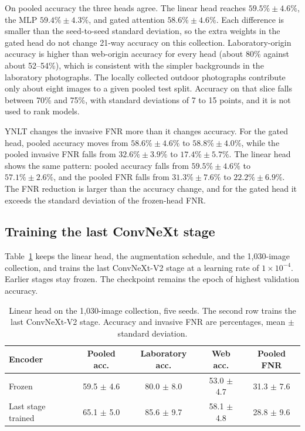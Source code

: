 \documentclass[final,3p,times,twocolumn]{elsarticle}
\begin{document}
On pooled accuracy the three heads agree. The linear head reaches \(59.5\% \pm 4.6\%\), the MLP \(59.4\% \pm 4.3\%\), and gated attention \(58.6\% \pm 4.6\%\). Each difference is smaller than the seed-to-seed standard deviation, so the extra weights in the gated head do not change 21-way accuracy on this collection. Laboratory-origin accuracy is higher than web-origin accuracy for every head (about 80\% against about 52--54\%), which is consistent with the simpler backgrounds in the laboratory photographs. The locally collected outdoor photographs contribute only about eight images to a given pooled test split. Accuracy on that slice falls between 70\% and 75\%, with standard deviations of 7 to 15 points, and it is not used to rank models.

YNLT changes the invasive FNR more than it changes accuracy. For the gated head, pooled accuracy moves from \(58.6\% \pm 4.6\%\) to \(58.8\% \pm 4.0\%\), while the pooled invasive FNR falls from \(32.6\% \pm 3.9\%\) to \(17.4\% \pm 5.7\%\). The linear head shows the same pattern: pooled accuracy falls from \(59.5\% \pm 4.6\%\) to \(57.1\% \pm 2.6\%\), and the pooled FNR falls from \(31.3\% \pm 7.6\%\) to \(22.2\% \pm 6.9\%\). The FNR reduction is larger than the accuracy change, and for the gated head it exceeds the standard deviation of the frozen-head FNR.

\subsection{Training the last ConvNeXt stage}
\label{subsec:laststage}

Table~\ref{tab:laststage} keeps the linear head, the augmentation schedule, and the 1{,}030-image collection, and trains the last ConvNeXt-V2 stage at a learning rate of \(1\times 10^{-4}\). Earlier stages stay frozen. The checkpoint remains the epoch of highest validation accuracy.

\begin{table}[!ht]
    \centering
    \caption{Linear head on the 1{,}030-image collection, five seeds. The second row trains the last ConvNeXt-V2 stage. Accuracy and invasive FNR are percentages, mean \(\pm\) standard deviation.}
    \label{tab:laststage}
    \renewcommand{\arraystretch}{1.2}
    \small
    \begin{tabular}{lcccc}
        \hline
        \textbf{Encoder} & \textbf{Pooled acc.} & \textbf{Laboratory acc.} & \textbf{Web acc.} & \textbf{Pooled FNR} \\
        \hline
        Frozen & 59.5 $\pm$ 4.6 & 80.0 $\pm$ 8.0 & 53.0 $\pm$ 4.7 & 31.3 $\pm$ 7.6 \\
        Last stage trained & 65.1 $\pm$ 5.0 & 85.6 $\pm$ 9.7 & 58.1 $\pm$ 4.8 & 28.8 $\pm$ 9.6 \\
        \hline
    \end{tabular}
\end{table}
\end{document}
